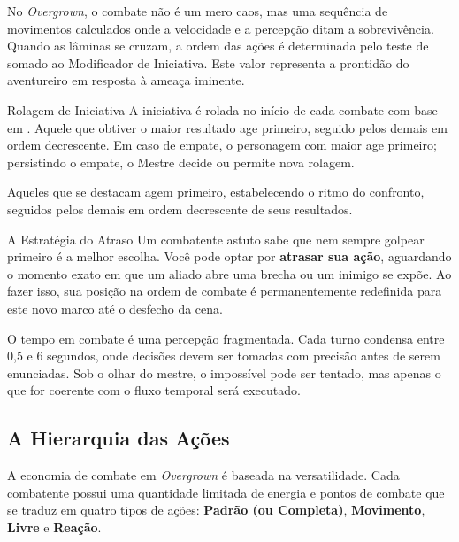

No \textit{Overgrown}, o combate não é um mero caos, mas uma sequência de movimentos calculados onde a velocidade e a percepção ditam a sobrevivência. Quando as lâminas se cruzam, a ordem das ações é determinada pelo teste de  somado ao Modificador de Iniciativa. Este valor representa a prontidão do aventureiro em resposta à ameaça iminente.

\begin{rpgboxtips}{Rolagem de Iniciativa}
A iniciativa é rolada no início de cada combate com base em . Aquele que obtiver o maior resultado age primeiro, seguido pelos demais em ordem decrescente. Em caso de empate, o personagem com maior  age primeiro; persistindo o empate, o Mestre decide ou permite nova rolagem.
\end{rpgboxtips}

Aqueles que se destacam agem primeiro, estabelecendo o ritmo do confronto, seguidos pelos demais em ordem decrescente de seus resultados.

\begin{rpgboxtips}{A Estratégia do Atraso}
Um combatente astuto sabe que nem sempre golpear primeiro é a melhor escolha. Você pode optar por \textbf{atrasar sua ação}, aguardando o momento exato em que um aliado abre uma brecha ou um inimigo se expõe. Ao fazer isso, sua posição na ordem de combate é permanentemente redefinida para este novo marco até o desfecho da cena.
\end{rpgboxtips}


O tempo em combate é uma percepção fragmentada. Cada turno condensa entre 0,5 e 6 segundos, onde decisões devem ser tomadas com precisão antes de serem enunciadas. Sob o olhar do mestre, o impossível pode ser tentado, mas apenas o que for coerente com o fluxo temporal será executado.

\subsection*{A Hierarquia das Ações}

A economia de combate em \textit{Overgrown} é baseada na versatilidade. Cada combatente possui uma quantidade limitada de energia e pontos de combate que se traduz em quatro tipos de ações: \textbf{Padrão (ou Completa)}, \textbf{Movimento}, \textbf{Livre} e \textbf{Reação}.

